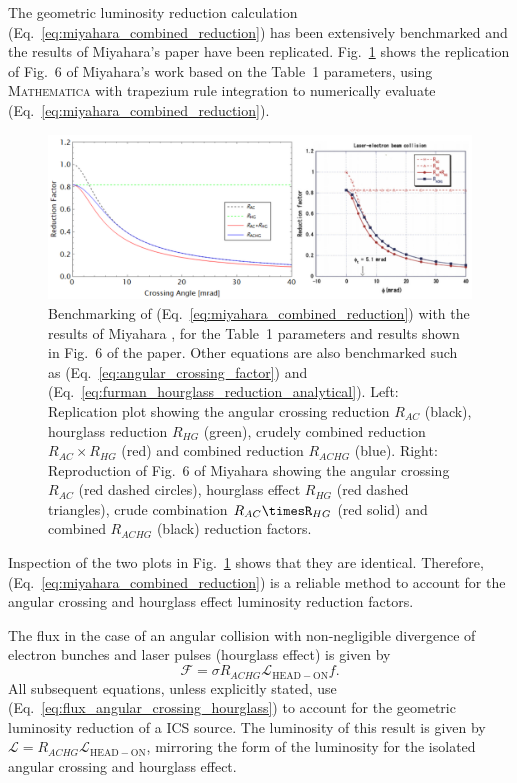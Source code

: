 \documentclass[../main.tex]{subfiles}
\begin{document}
The geometric luminosity reduction calculation (Eq.~\ref{eq:miyahara_combined_reduction}) has been extensively benchmarked and the results of Miyahara's paper \cite{miyahara2008luminosity} have been replicated. Fig.~\ref{fig:miyahara_benchmarking} shows the replication of Fig.~6 of Miyahara's work \cite{miyahara2008luminosity} based on the Table~1 parameters, using \textsc{Mathematica} with trapezium rule integration to numerically evaluate (Eq.~\ref{eq:miyahara_combined_reduction}).
\begin{figure}[!h]
\centering
\includegraphics[width=\textwidth]{Figures/Photon_Production_by_Inverse_Compton_Scattering/miyahara_benchmarking.pdf}
\caption{Benchmarking of (Eq.~\ref{eq:miyahara_combined_reduction}) with the results of Miyahara \cite{miyahara2008luminosity}, for the Table~1 parameters and results shown in Fig.~6 of the paper. Other equations are also benchmarked such as (Eq.~\ref{eq:angular_crossing_factor}) and (Eq.~\ref{eq:furman_hourglass_reduction_analytical}). Left: Replication plot showing the angular crossing reduction $R_{AC}$ (black), hourglass reduction $R_{HG}$ (green), crudely combined reduction $R_{AC}\times R_{HG}$ (red) and combined reduction $R_{ACHG}$ (blue). Right: Reproduction of Fig.~6 of Miyahara \cite{miyahara2008luminosity} showing the angular crossing $R_{AC}$ (red dashed circles), hourglass effect $R_{HG}$ (red dashed triangles), crude combination $R_{AC}\timesR_{HG}$ (red solid) and combined $R_{ACHG}$ (black) reduction factors.}
\label{fig:miyahara_benchmarking}
\end{figure}
Inspection of the two plots in Fig.~\ref{fig:miyahara_benchmarking} shows that they are identical. Therefore, (Eq.~\ref{eq:miyahara_combined_reduction}) is a reliable method to account for the angular crossing and hourglass effect luminosity reduction factors. 

The flux in the case of an angular collision with non-negligible divergence of electron bunches and laser pulses (hourglass effect) is given by
\begin{equation}
\mathcal{F} = \sigma R_{ACHG}\mathcal{L}_{\mathrm{HEAD-ON}}f.
\label{eq:flux_angular_crossing_hourglass}
\end{equation}
All subsequent equations, unless explicitly stated, use (Eq.~\ref{eq:flux_angular_crossing_hourglass}) to account for the geometric luminosity reduction of a ICS source. The luminosity of this result is given by $\mathcal{L} = R_{ACHG}\mathcal{L}_{\mathrm{HEAD-ON}}$, mirroring the form of the luminosity for the isolated angular crossing and hourglass effect.
\end{document}
